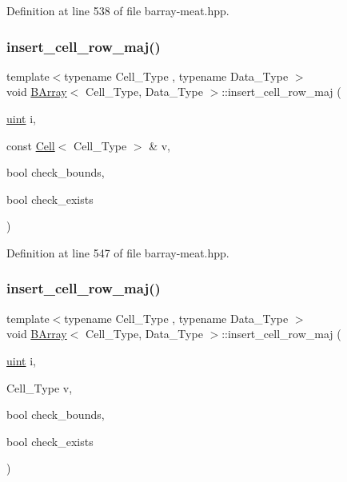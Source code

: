Definition at line 538 of file barray-\/meat.\+hpp.

\mbox{\label{class_b_array_a32ce549812fcac0af0a39c3ba0a22add}} 
\subsubsection{\texorpdfstring{insert\+\_\+cell\+\_\+row\+\_\+maj()}{insert\_cell\_row\_maj()}\hspace{0.1cm}{\footnotesize\ttfamily [1/2]}}
{\footnotesize\ttfamily template$<$typename Cell\+\_\+\+Type , typename Data\+\_\+\+Type $>$ \\
void \hyperlink{class_b_array}{B\+Array}$<$ Cell\+\_\+\+Type, Data\+\_\+\+Type $>$\+::insert\+\_\+cell\+\_\+row\+\_\+maj (\begin{DoxyParamCaption}\item[{\hyperlink{typedefs_8hpp_a91ad9478d81a7aaf2593e8d9c3d06a14}{uint}}]{i,  }\item[{const \hyperlink{class_cell}{Cell}$<$ Cell\+\_\+\+Type $>$ \&}]{v,  }\item[{bool}]{check\+\_\+bounds,  }\item[{bool}]{check\+\_\+exists }\end{DoxyParamCaption})\hspace{0.3cm}{\ttfamily [inline]}}



Definition at line 547 of file barray-\/meat.\+hpp.

\mbox{\label{class_b_array_aec0c657e14fd003cc6d4428a816d28aa}} 
\subsubsection{\texorpdfstring{insert\+\_\+cell\+\_\+row\+\_\+maj()}{insert\_cell\_row\_maj()}\hspace{0.1cm}{\footnotesize\ttfamily [2/2]}}
{\footnotesize\ttfamily template$<$typename Cell\+\_\+\+Type , typename Data\+\_\+\+Type $>$ \\
void \hyperlink{class_b_array}{B\+Array}$<$ Cell\+\_\+\+Type, Data\+\_\+\+Type $>$\+::insert\+\_\+cell\+\_\+row\+\_\+maj (\begin{DoxyParamCaption}\item[{\hyperlink{typedefs_8hpp_a91ad9478d81a7aaf2593e8d9c3d06a14}{uint}}]{i,  }\item[{Cell\+\_\+\+Type}]{v,  }\item[{bool}]{check\+\_\+bounds,  }\item[{bool}]{check\+\_\+exists }\end{DoxyParamCaption})\hspace{0.3cm}{\ttfamily [inline]}}



